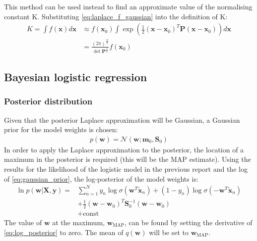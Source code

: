 \documentclass[a4paper]{article}
\begin{document}
    This method can be used instead to find an approximate value of the normalising constant K. Substituting
    \autoref{eq:laplace_f_gaussian} into the definition of K:
    \begin{align}
        K = \int f(\bm{x}) d\bm{x} &\approx f(\bm{x}_0) \int \exp \left(\frac{1}{2} (\bm{x} - \bm{x}_0)^T \bm{P} (\bm{x} - \bm{x}_0) \right) d\bm{x} \nonumber \\
        &= \frac{(2\pi)^\frac{N}{2}}{\det \bm{P}^\frac{1}{2}} f(\bm{x}_0)
        \label{eq:normalising_constant}
    \end{align}

    \subsection{Bayesian logistic regression}
    \subsubsection{Posterior distribution}
    Given that the posterior Laplace approximation will be Gaussian, a Gaussian prior for the model weights is chosen:
    \begin{align}
        p(\bm{w}) = \mathcal{N}(\bm{w}; \bm{m}_0, \bm{S}_0)
        \label{eq:gaussian_prior}
    \end{align}
    In order to apply the Laplace approximation to the posterior, the location of a maximum in the posterior is required
    (this will be the MAP estimate).
    Using the results for the likelihood of the logistic model in the previous report and the log of \autoref{eq:gaussian_prior},
    the log-posterior of the model weights is:
    \begin{align}
        \ln p(\bm{w} | \bm{X}, \bm{y}) =
        & \sum_{n=1}^{N} y_n \log\sigma( \bm{w}^T \tilde{\bm{x}}_n) + (1-y_n) \log\sigma(-\bm{w}^T \tilde{\bm{x}}_n) \nonumber \\
        & + \frac{1}{2} (\bm{w} - \bm{w}_0)^T \bm{S}_0^{-1} (\bm{w} - \bm{w}_0) \nonumber \\
        & + \text{const}
        \label{eq:log_posterior}
    \end{align}
    The value of $\bm{w}$ at the maximum, $\bm{w}_{\text{MAP}}$, can be found by setting the derivative of
    \autoref{eq:log_posterior} to zero.
    The mean of $q(\bm{w})$ will be set to $\bm{w}_{\text{MAP}}$.
\end{document}
